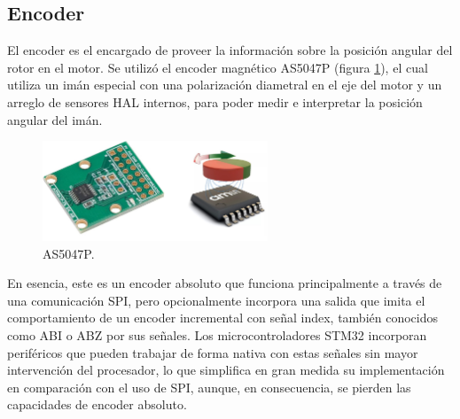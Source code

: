 \documentclass[11pt]{report}
\begin{document}
\newpage
\subsection{Encoder}

El encoder es el encargado de proveer la información sobre la posición angular del rotor en el motor. Se utilizó el encoder magnético AS5047P (figura \ref{AS5047P}), el cual utiliza un imán especial con una polarización diametral en el eje del motor y un arreglo de sensores HAL internos, para poder medir e interpretar la posición angular del imán.

\begin{figure}[ht]
	\centering
	\includegraphics[width=0.6\textwidth]{imagenes/Motor/AS5047P.jpg}
	\caption{AS5047P.}
	\label{AS5047P}
\end{figure}
\FloatBarrier

En esencia, este es un encoder absoluto que funciona principalmente a través de una comunicación SPI, pero opcionalmente incorpora una salida que imita el comportamiento de un encoder incremental con señal index, también conocidos como ABI o ABZ por sus señales. Los microcontroladores STM32 incorporan periféricos que pueden trabajar de forma nativa con estas señales sin mayor intervención del procesador, lo que simplifica en gran medida su implementación en comparación con el uso de SPI, aunque, en consecuencia, se pierden las capacidades de encoder absoluto.
\end{document}
